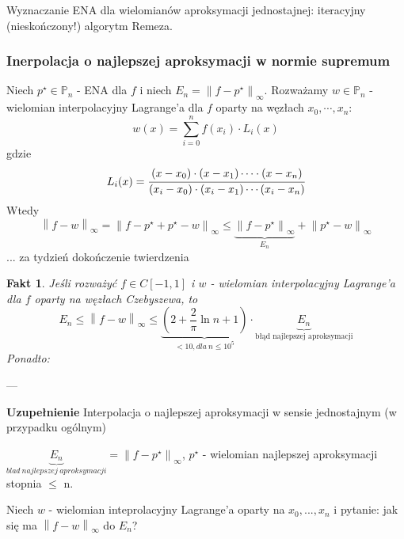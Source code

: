 \documentclass[hidelinks,a4paper,fleqn,oneside]{book}
\newcommand{\norm}[1]{\left\lVert#1\right\rVert}
\newtheorem{fakt}{Fakt}
\begin{document}
Wyznaczanie ENA dla wielomianów aproksymacji jednostajnej: iteracyjny (nieskończony!) algorytm Remeza.

\subsubsection{Inerpolacja o najlepszej aproksymacji w normie supremum}

Niech $p^\star \in \mathbb{P}_n$ - ENA dla $f$ i niech $E_n = \norm{f- p^\star}_\infty$. Rozważamy $w \in \mathbb{P}_n$ - wielomian interpolacyjny Lagrange'a dla $f$ oparty na węzłach $x_0, \cdots, x_n$:
\[
	w(x) = \sum_{i=0}^n f(x_i) \cdot L_i(x)
\]
gdzie
\[
	L_i(x) = \cfrac{(x-x_0)\cdot(x-x_1)\cdots\cdot(x-x_n)}{(x_i-x_0)\cdot(x_i - x_1)\cdots(x_i-x_n)}
\]
Wtedy
\[
	\norm{f-w}_\infty = \norm{f-p^\star + p^\star - w}_\infty \leq \underbrace{\norm{f-p^\star}_\infty}_{E_n} + \norm{p^\star - w}_\infty
\]
... za tydzień dokończenie twierdzenia

\begin{fakt}
	Jeśli rozważyć $f \in C[-1, 1]$ i $w$ - wielomian interpolacyjny Lagrange'a dla $f$ oparty na węzłach Czebyszewa, to 
	\[
		E_n \leq \norm{f-w}_\infty \leq \underbrace{(2+\frac{2}{\pi}\ln{n+1})}_{<10, dla\ n \leq 10^5}\cdot \underbrace{E_n}_{\textrm{błąd najlepszej aproksymacji}}
	\]
	Ponadto:
	\[
	\]
\end{fakt}

---

\textbf{Uzupełnienie} Interpolacja o najlepszej aproksymacji w sensie jednostajnym (w przypadku ogólnym)

$\underbrace{E_n}_{blad\ najlepszej\ aproksymacji} = \norm{f-p^\star}_\infty$, $p^\star$ - wielomian najlepszej aproksymacji stopnia $\leq$ n.

Niech $w$ - wielomian inteprolacyjny Lagrange'a oparty na $x_0, ..., x_n$ i pytanie: jak się ma $\norm{f-w}_\infty$ do $E_n$?
\end{document}
